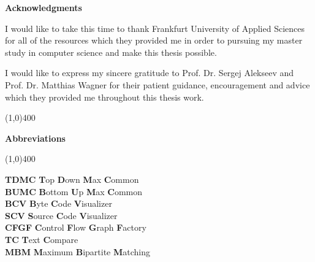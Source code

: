 \documentclass{report}
\newcommand{\Hline}{\par
  \begin{center}
   \line(1,0){400}
   \end{center}
}
\begin{document}
\newpage
\begin{center}{\huge\bf Acknowledgments\par}\end{center}
\null
I would like to take this time to thank Frankfurt University of Applied Sciences for all of the resources which they provided me in order to pursuing my master study in computer science and make this thesis possible.\vspace{5 mm}

\noindent I would like to express my sincere gratitude to Prof. Dr. Sergej Alekseev and Prof. Dr. Matthias Wagner for their patient guidance, encouragement and advice which they provided me throughout this thesis work.


\newpage
\tableofcontents
\listoffigures
\listoftables

\newpage
{}
\Hline
\begin{center}{\huge\bf Abbreviations\par}\end{center}
\Hline
\vspace{10mm}
\null

\noindent
\textbf{TDMC} \hspace{20 mm} \textbf{T}op \textbf{D}own \textbf{M}ax \textbf{C}ommon \\
\textbf{BUMC} \hspace{20 mm} \textbf{B}ottom \textbf{U}p \textbf{M}ax \textbf{C}ommon \\
\textbf{BCV} \hspace{24 mm}  \textbf{B}yte \textbf{C}ode \textbf{V}isualizer \\
\textbf{SCV} \hspace{25 mm}  \textbf{S}ource \textbf{C}ode \textbf{V}isualizer \\
\textbf{CFGF} \hspace{22 mm} \textbf{C}ontrol \textbf{F}low \textbf{G}raph  \textbf{F}actory \\
\textbf{TC} \hspace{27 mm}   \textbf{T}ext \textbf{C}ompare \\
\textbf{MBM} \hspace{22 mm} \textbf{M}aximum \textbf{B}ipartite \textbf{M}atching \\
\end{document}

